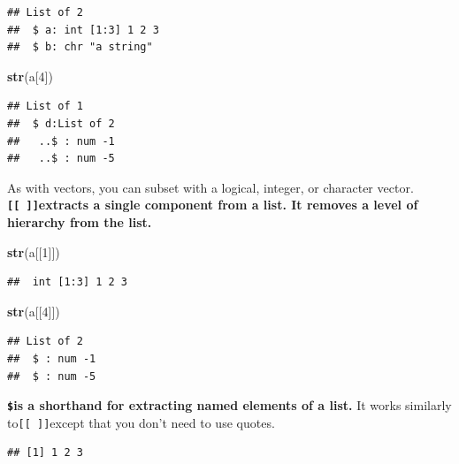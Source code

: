 \documentclass[
]{book}
\newenvironment{Shaded}{\begin{snugshade}}{\end{snugshade}}
\newcommand{\DecValTok}[1]{\textcolor[rgb]{0.00,0.00,0.81}{#1}}
\newcommand{\KeywordTok}[1]{\textcolor[rgb]{0.13,0.29,0.53}{\textbf{#1}}}
\newcommand{\NormalTok}[1]{#1}
\newcommand{\OperatorTok}[1]{\textcolor[rgb]{0.81,0.36,0.00}{\textbf{#1}}}
\begin{document}
\begin{verbatim}
## List of 2
##  $ a: int [1:3] 1 2 3
##  $ b: chr "a string"
\end{verbatim}

\begin{Shaded}
\begin{Highlighting}[]
    \KeywordTok{str}\NormalTok{(a[}\DecValTok{4}\NormalTok{])}
\end{Highlighting}
\end{Shaded}

\begin{verbatim}
## List of 1
##  $ d:List of 2
##   ..$ : num -1
##   ..$ : num -5
\end{verbatim}

As with vectors, you can subset with a logical, integer, or character vector. \textbf{\texttt{{[}{[}\ {]}{]}}extracts a single component from a list. It removes a level of hierarchy from the list.}

\begin{Shaded}
\begin{Highlighting}[]
    \KeywordTok{str}\NormalTok{(a[[}\DecValTok{1}\NormalTok{]])}
\end{Highlighting}
\end{Shaded}

\begin{verbatim}
##  int [1:3] 1 2 3
\end{verbatim}

\begin{Shaded}
\begin{Highlighting}[]
    \KeywordTok{str}\NormalTok{(a[[}\DecValTok{4}\NormalTok{]])}
\end{Highlighting}
\end{Shaded}

\begin{verbatim}
## List of 2
##  $ : num -1
##  $ : num -5
\end{verbatim}

\textbf{\texttt{\$}is a shorthand for extracting named elements of a list.} It works similarly to\texttt{{[}{[}\ {]}{]}}except that you don't need to use quotes.

\begin{Shaded}
\end{Shaded}

\begin{verbatim}
## [1] 1 2 3
\end{verbatim}
\end{document}
